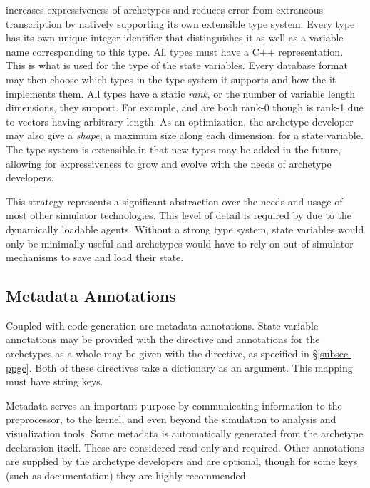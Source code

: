 \Cyclus increases expressiveness of archetypes and reduces error from extraneous 
transcription by natively supporting its own extensible type system. Every type
has its own unique integer identifier that distinguishes it as well as 
a variable name corresponding to this type. All types
must have a C++ representation. This is what is used for the type of the state
variables. Every database format may then choose which types in the type system it 
supports and how the it implements them. All types have a static \emph{rank}, or the 
number of variable length dimensions, they support.  For example,  and 
 are both rank-0 though  is rank-1 due to 
vectors having arbitrary length. As an optimization, the archetype developer 
may also give a \emph{shape}, a maximum size along each dimension, for a state 
variable. The type system is extensible in that new types may be added in the future, 
allowing for expressiveness to grow and evolve with the needs of archetype developers.

This strategy represents a significant abstraction over the needs and usage of most 
other simulator technologies. This level of detail is required by \cyclus due to the
dynamically loadable agents. Without a strong type system, state variables 
would only be minimally useful and archetypes would have to rely on out-of-simulator
mechanisms to save and load their state.

\subsection{Metadata Annotations}

Coupled with code generation are metadata annotations.  State variable annotations
may be provided with the  directive and annotations for 
the archetypes as a whole may be given with the  directive,
as specified in \S \ref{subsec-ppgc}. Both of these directives take a dictionary 
as an argument. This mapping must have string keys.

Metadata serves an important purpose by communicating information to the \cyclus
preprocessor, to the \cyclus kernel, and even beyond the simulation to analysis 
and visualization tools. Some metadata is automatically generated from the 
archetype declaration itself.  These are considered read-only and required. 
Other annotations are supplied by the archetype developers and are optional, 
though for some keys (such as documentation) they are highly recommended.

